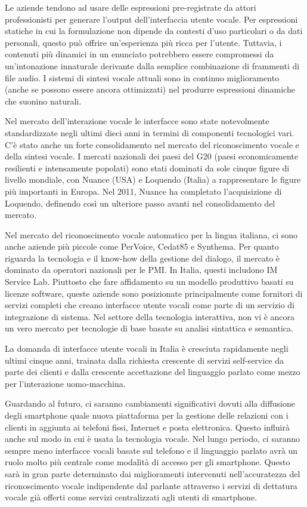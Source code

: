 \begin{multicols}{2}
Le aziende tendono ad usare delle espressioni pre-registrate da attori professionisti per generare l'output dell'interfaccia utente vocale. Per  espressioni statiche in cui la formulazione non dipende da contesti d'uso particolari o da dati personali, questo pu\`{o} offrire un'esperienza pi\`{u} ricca per l'utente. Tuttavia, i contenuti pi\`{u} dinamici in un enunciato potrebbero essere compromessi da un'intonazione innaturale derivante dalla semplice combinazione di frammenti di file audio. I sistemi di sintesi vocale attuali sono in continuo miglioramento (anche se possono essere ancora ottimizzati) nel produrre espressioni dinamiche che suonino naturali.

Nel mercato dell'interazione vocale le interfacce sono state notevolmente standardizzate negli ultimi dieci anni in termini di componenti tecnologici vari. C'\`{e} stato anche un forte consolidamento nel mercato del riconoscimento vocale e della sintesi vocale. I mercati nazionali dei paesi del G20 (paesi economicamente resilienti e intensamente popolati) sono stati dominati da sole cinque figure di livello mondiale, con Nuance (USA) e Loquendo (Italia) a rappresentare le figure pi\`{u} importanti in Europa. Nel 2011, Nuance ha completato l'acquisizione di Loquendo, definendo cos\`{i} un ulteriore passo avanti nel consolidamento del mercato.

Nel mercato del riconoscimento vocale automatico per la lingua italiana, ci sono anche aziende pi\`{u} piccole come PerVoice, Cedat85 e Synthema. Per quanto riguarda la tecnologia e il know-how della gestione del dialogo, il mercato \`{e} dominato da operatori nazionali per le PMI. In Italia, questi includono IM Service Lab. Piuttosto che fare affidamento su un modello produttivo basati su licenze software, queste aziende sono posizionate principalmente come fornitori di servizi completi che creano interfacce utente vocali come parte di un servizio di integrazione di sistema. Nel settore della tecnologia interattiva, non vi \`{e} ancora un vero mercato per tecnologie di base basate su analisi sintattica e semantica.

La domanda di interfacce utente vocali in Italia \`{e} cresciuta rapidamente negli ultimi cinque anni, trainata dalla richiesta crescente di servizi self-service da parte dei clienti e dalla crescente accettazione del linguaggio parlato come mezzo per l'interazione uomo-macchina.

Guardando al futuro, ci saranno cambiamenti significativi dovuti alla diffusione degli smartphone quale nuova piattaforma per la gestione delle relazioni con i clienti in aggiunta ai telefoni fissi, Internet e posta elettronica. Questo influir\`{a} anche sul modo in cui \`{e} usata la tecnologia vocale. Nel lungo periodo, ci saranno sempre meno interfacce vocali basate sul telefono e il linguaggio parlato avr\`{a} un ruolo molto pi\`{u} centrale come modalit\`{a} di accesso per gli smartphone. Questo sar\`{a} in gran parte determinato dai miglioramenti intervenuti nell'accuratezza del riconoscimento vocale indipendente dal parlante attraverso i servizi di dettatura vocale gi\`{a} offerti come servizi centralizzati agli utenti di smartphone.



\end{multicols}
